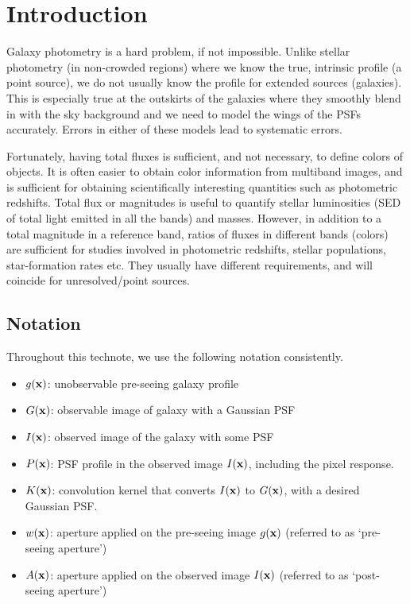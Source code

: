 \section{Introduction}
Galaxy photometry is a hard problem, if not impossible.
Unlike stellar photometry (in non-crowded regions) where we know the true, intrinsic profile (a point source), we do not usually know the profile for extended sources (galaxies).
This is especially true at the outskirts of the galaxies where they smoothly blend in with the sky background and we need to model the wings of the PSFs accurately.
Errors in either of these models lead to systematic errors.

Fortunately, having total fluxes is sufficient, and not necessary, to define colors of objects.
It is often easier to obtain color information from multiband images, and is sufficient for obtaining scientifically interesting quantities such as photometric redshifts.
Total flux or magnitudes is useful to quantify stellar luminosities (SED of total light emitted in all the bands) and masses.
However, in addition to a total magnitude in a reference band, ratios of fluxes in different bands (colors) are sufficient for studies involved in photometric redshifts, stellar populations, star-formation rates etc.
They usually have different requirements, and will coincide for unresolved/point sources.

\subsection{Notation}
Throughout this technote, we use the following notation consistently.

\begin{itemize}
    \item $g({\bf x})$: unobservable pre-seeing galaxy profile
    \item $G({\bf x})$: observable image of galaxy with a Gaussian PSF
    \item $I({\bf x})$: observed image of the galaxy with some PSF
    \item $P({\bf x})$: PSF profile in the observed image $I({\bf x})$, including the pixel response.
    \item $K({\bf x})$: convolution kernel that converts $I({\bf x})$ to $G({\bf x})$, with a desired Gaussian PSF.
    \item $w({\bf x})$: aperture applied on the pre-seeing image $g({\bf x})$ (referred to as `pre-seeing aperture')
    \item $A({\bf x})$: aperture applied on the observed image $I({\bf x})$ (referred to as `post-seeing aperture')
\end{itemize}

